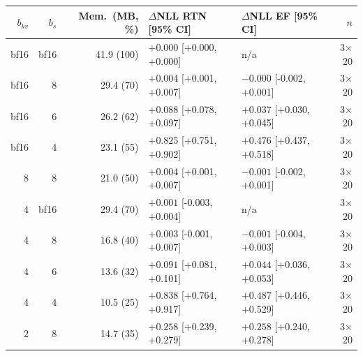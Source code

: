 \begin{tabular}{rrrllr}
\toprule
$b_{kv}$ & $b_s$ & Mem.\ (MB, \%) & $\Delta$NLL RTN [95\% CI] & $\Delta$NLL EF [95\% CI] & $n$ \\
\midrule
bf16 & bf16 & 41.9 (100) & $+0.000$ [+0.000, +0.000] & n/a & 3$\times$20 \\
bf16 & 8 & 29.4 (70) & $+0.004$ [+0.001, +0.007] & $-0.000$ [-0.002, +0.001] & 3$\times$20 \\
bf16 & 6 & 26.2 (62) & $+0.088$ [+0.078, +0.097] & $+0.037$ [+0.030, +0.045] & 3$\times$20 \\
bf16 & 4 & 23.1 (55) & $+0.825$ [+0.751, +0.902] & $+0.476$ [+0.437, +0.518] & 3$\times$20 \\
8 & 8 & 21.0 (50) & $+0.004$ [+0.001, +0.007] & $-0.001$ [-0.002, +0.001] & 3$\times$20 \\
4 & bf16 & 29.4 (70) & $+0.001$ [-0.003, +0.004] & n/a & 3$\times$20 \\
4 & 8 & 16.8 (40) & $+0.003$ [-0.001, +0.007] & $-0.001$ [-0.004, +0.003] & 3$\times$20 \\
4 & 6 & 13.6 (32) & $+0.091$ [+0.081, +0.101] & $+0.044$ [+0.036, +0.053] & 3$\times$20 \\
4 & 4 & 10.5 (25) & $+0.838$ [+0.764, +0.917] & $+0.487$ [+0.446, +0.529] & 3$\times$20 \\
2 & 8 & 14.7 (35) & $+0.258$ [+0.239, +0.279] & $+0.258$ [+0.240, +0.278] & 3$\times$20 \\
\bottomrule
\end{tabular}
